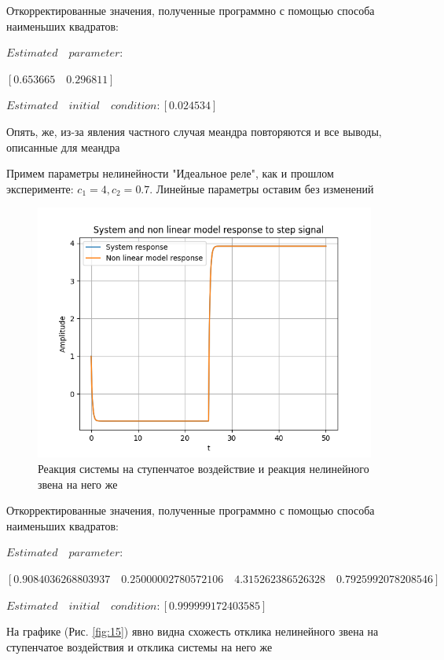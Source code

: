 Откорректированные значения, полученные программно с помощью способа наименьших квадратов:

$Estimated\quad parameter:$

\qquad$[0.653665\quad 0.296811]$

$Estimated\quad initial\quad condition: [0.024534]$

Опять, же, из-за явления частного случая меандра повторяются и все выводы, описанные для меандра

Примем параметры нелинейности "Идеальное реле", как и прошлом эксперименте: $ c_1 = 4, c_2 = 0.7 $. Линейные параметры оставим без изменений

\begin{figure}[H]
	\centering
	\includegraphics[width=1\linewidth]{body/images/System-and-non-linear-model-response-to-step-signal.png}
	\caption{Реакция системы на ступенчатое воздействие и реакция нелинейного звена на него же}
	\label{fig:16}
\end{figure}

Откорректированные значения, полученные программно с помощью способа наименьших квадратов:

$Estimated\quad parameter:$

\qquad$[0.9084036268803937\quad 0.25000002780572106\quad 4.315262386526328\quad 0.7925992078208546]$

$Estimated\quad initial\quad condition: [0.999999172403585]$

На графике (Рис. \ref{fig:15}) явно видна схожесть отклика нелинейного звена на ступенчатое воздействия и отклика системы на него же

